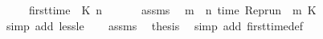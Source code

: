 \begin{isabellebody}
\ \ \ \ \ {\isacartoucheopen}first{\isacharunderscore}time\ {\isasymrho}\ K\ n\ {\isasymtau}{\isacartoucheclose}\isanewline
%
\isadelimproof
%
\endisadelimproof
%
\isatagproof
{}\isamarkupfalse%
\ {\isacharminus}\isanewline
\ \ \isamarkupfalse%
\ assms{\isacharparenleft}{}{\isacharparenright}\ \isamarkupfalse%
\ {\isacartoucheopen}{\isasymforall}m\ {\isacharless}\ n{\isachardot}\ time\ {\isacharparenleft}{\isacharparenleft}Rep{\isacharunderscore}run\ {\isasymrho}{\isacharparenright}\ m\ K{\isacharparenright}\ {\isasymnoteq}\ {\isasymtau}{\isacartoucheclose}\ \isamarkupfalse%
\ {\isacharparenleft}simp\ add{\isacharcolon}\ less{\isacharunderscore}le{\isacharparenright}\isanewline
\ \ \isamarkupfalse%
\ assms{\isacharparenleft}{}{\isacharparenright}\ \isamarkupfalse%
\ {\isacharquery}thesis\ \isamarkupfalse%
\ {\isacharparenleft}simp\ add{\isacharcolon}\ first{\isacharunderscore}time{\isacharunderscore}def{\isacharparenright}\isanewline
{}\isamarkupfalse%
%
\endisatagproof
{\isafoldproof}%
%
\isadelimproof
\isanewline
%
\endisadelimproof
%
\isadelimtheory
\isanewline
%
\endisadelimtheory
%
\isatagtheory
{}\isamarkupfalse%
%
\endisatagtheory
{\isafoldtheory}%
%
\isadelimtheory
%
\endisadelimtheory
%
\end{isabellebody}%
\endinput
